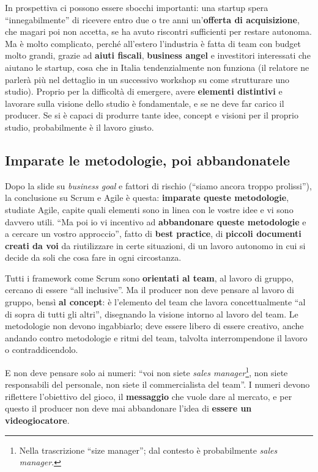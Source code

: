 In prospettiva ci possono essere sbocchi importanti: una startup spera
``innegabilmente'' di ricevere entro due o tre anni un'\textbf{offerta di
acquisizione}, che magari poi non accetta, se ha avuto riscontri sufficienti
per restare autonoma. Ma è molto complicato, perché all'estero l'industria è
fatta di team con budget molto grandi, grazie ad \textbf{aiuti fiscali},
\textbf{business angel} e investitori interessati che aiutano le startup, cosa
che in Italia tendenzialmente non funziona (il relatore ne parlerà più nel
dettaglio in un successivo workshop su come strutturare uno studio). Proprio per
la difficoltà di emergere, avere \textbf{elementi distintivi} e lavorare sulla
visione dello studio è fondamentale, e se ne deve far carico il producer. Se si è
capaci di produrre tante idee, concept e visioni per il proprio studio,
probabilmente è il lavoro giusto.

\subsection{Imparate le metodologie, poi abbandonatele}

Dopo la slide su \emph{business goal} e fattori di rischio (``siamo ancora
troppo prolissi''), la conclusione su Scrum e Agile è questa:
\textbf{imparate queste metodologie}, studiate Agile, capite quali elementi sono
in linea con le vostre idee e vi sono davvero utili. ``Ma poi io vi incentivo ad
\textbf{abbandonare queste metodologie} e a cercare un vostro approccio'', fatto
di \textbf{best practice}, di \textbf{piccoli documenti creati da voi} da
riutilizzare in certe situazioni, di un lavoro autonomo in cui si decide da soli
che cosa fare in ogni circostanza.

Tutti i framework come Scrum sono \textbf{orientati al team}, al lavoro di
gruppo, cercano di essere ``all inclusive''. Ma il producer non deve pensare al
lavoro di gruppo, bensì \textbf{al concept}: è l'elemento del team che lavora
concettualmente ``al di sopra di tutti gli altri'', disegnando la visione
intorno al lavoro del team. Le metodologie non devono ingabbiarlo; deve essere
libero di essere creativo, anche andando contro metodologie e ritmi del team,
talvolta interrompendone il lavoro o contraddicendolo.

E non deve pensare solo ai numeri: ``voi non siete \emph{sales
manager}\footnote{Nella trascrizione ``size manager''; dal contesto è
probabilmente \emph{sales manager}.}, non siete responsabili del personale, non
siete il commercialista del team''. I numeri devono riflettere l'obiettivo del
gioco, il \textbf{messaggio} che vuole dare al mercato, e per questo il producer
non deve mai abbandonare l'idea di \textbf{essere un videogiocatore}.

